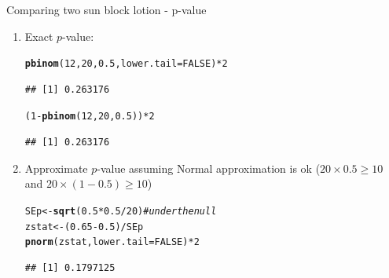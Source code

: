 \documentclass{beamer}\usepackage[]{graphicx}\usepackage[]{color}
\newcommand{\hlnum}[1]{\textcolor[rgb]{0.686,0.059,0.569}{#1}}%
\newcommand{\hlcom}[1]{\textcolor[rgb]{0.678,0.584,0.686}{\textit{#1}}}%
\newcommand{\hlopt}[1]{\textcolor[rgb]{0,0,0}{#1}}%
\newcommand{\hlstd}[1]{\textcolor[rgb]{0.345,0.345,0.345}{#1}}%
\newcommand{\hlkwb}[1]{\textcolor[rgb]{0.69,0.353,0.396}{#1}}%
\newcommand{\hlkwc}[1]{\textcolor[rgb]{0.333,0.667,0.333}{#1}}%
\newcommand{\hlkwd}[1]{\textcolor[rgb]{0.737,0.353,0.396}{\textbf{#1}}}%
\newenvironment{knitrout}{}{} %
\begin{document}
\begin{frame}[fragile]{Comparing two sun block lotion - p-value}
\small
\begin{enumerate}
	\setlength\itemsep{.51em}
	
	\item Exact $p$-value:
\begin{knitrout}\scriptsize
{}\color{fgcolor}
\begin{alltt}
\hlkwd{pbinom}\hlstd{(}\hlnum{12}\hlstd{,} \hlnum{20}\hlstd{,} \hlnum{0.5}\hlstd{,} \hlkwc{lower.tail} \hlstd{=} \hlnum{FALSE}\hlstd{)}\hlopt{*}\hlnum{2}
\end{alltt}
\begin{verbatim}
## [1] 0.263176
\end{verbatim}
\begin{alltt}
\hlstd{(}\hlnum{1} \hlopt{-} \hlkwd{pbinom}\hlstd{(}\hlnum{12}\hlstd{,} \hlnum{20}\hlstd{,} \hlnum{0.5}\hlstd{))} \hlopt{*} \hlnum{2}
\end{alltt}
\begin{verbatim}
## [1] 0.263176
\end{verbatim}

\end{knitrout}
	\pause 

	\item Approximate $p$-value assuming Normal approximation is ok ($20 \times 0.5 \geq 10$ and $20 \times (1-0.5) \geq 10$)
\begin{knitrout}\scriptsize
{}\color{fgcolor}
\begin{alltt}
\hlstd{SEp} \hlkwb{<-} \hlkwd{sqrt}\hlstd{(}\hlnum{0.5}\hlopt{*}\hlnum{0.5}\hlopt{/}\hlnum{20}\hlstd{)} \hlcom{# under the null}
\hlstd{zstat} \hlkwb{<-} \hlstd{(}\hlnum{0.65} \hlopt{-} \hlnum{0.5}\hlstd{)} \hlopt{/} \hlstd{SEp}
\hlkwd{pnorm}\hlstd{(zstat,} \hlkwc{lower.tail} \hlstd{=} \hlnum{FALSE}\hlstd{)} \hlopt{*} \hlnum{2}
\end{alltt}
\begin{verbatim}
## [1] 0.1797125
\end{verbatim}

\end{knitrout}
	
	
	
\end{enumerate}

\end{frame}
\end{document}
